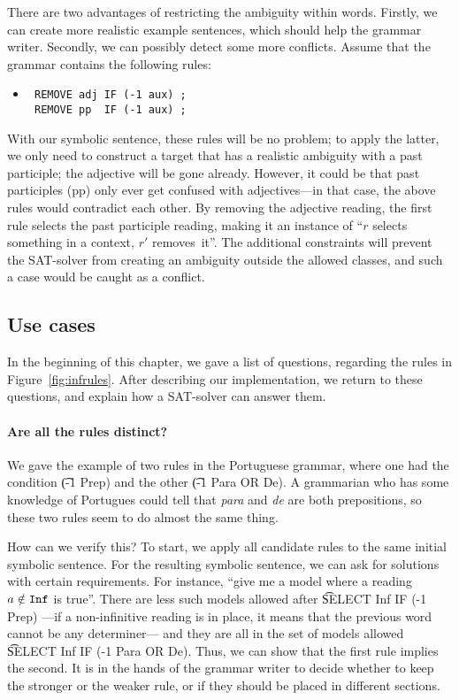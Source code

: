 There are two advantages of restricting the ambiguity within words.
Firstly, we can create more realistic example sentences, which should help the grammar writer.
Secondly, we can possibly detect some more conflicts. Assume that the grammar contains the following rules:

 \begin{itemize}
 \item[] 
\begin{verbatim}
 REMOVE adj IF (-1 aux) ;
 REMOVE pp  IF (-1 aux) ;
 \end{verbatim}
 \end{itemize}

 With our symbolic sentence, these rules will be no problem; to apply the latter, we only need to construct a target that has a realistic ambiguity with a past participle; the adjective will be gone already.
However, it could be that past participles (pp) only ever get confused with adjectives---in that case, the above rules would contradict each other.
 By removing the adjective reading, the first rule selects the past participle reading, making it an instance of ``$r$ selects something in a context, $r'$ removes~it''. 
The additional constraints will prevent the SAT-solver from creating an ambiguity outside the allowed classes, and such a case would be caught as a conflict.

\subsection{Use cases}

In the beginning of this chapter, we gave a list of questions, regarding the rules in Figure~\ref{fig:infrules}. After describing our implementation, we return to these questions, and explain how a SAT-solver can answer them.


\paragraph{Are all the rules distinct?} We gave the example of two rules in the Portuguese grammar, where one had the condition \t{(-1 Prep)} and the other \t{(-1 Para OR De)}. A grammarian who has some knowledge of Portugues could tell that {\em para} and {\em de} are both prepositions, so these two rules seem to do almost the same thing.

How can we verify this? To start, we apply all candidate rules to the same initial symbolic sentence. For the resulting symbolic sentence, we can ask for solutions with certain requirements.
For instance, ``give me a model where a reading $a \notin \texttt{Inf}$ is true''.
There are less such models allowed after \t{SELECT Inf IF (-1 Prep)}
---if a non-infinitive reading is in place, it means that the previous word cannot be any determiner---
and they are all in the set of models allowed \t{SELECT Inf IF (-1 Para OR De)}. Thus, we can show that the first rule implies the second. It is in the hands of the grammar writer to decide whether to keep the stronger or the weaker rule, or if they should be placed in different sections.


